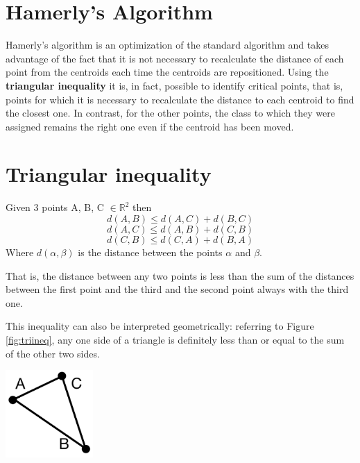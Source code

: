 \documentclass{report}
\begin{document}
\begin{minipage}[b]{0.48\textwidth}
  \section*{Hamerly's Algorithm}
  Hamerly's algorithm is an optimization of the standard algorithm and takes advantage of the fact that it is not necessary to recalculate the distance of each point from the centroids each time the centroids are repositioned. Using the \textbf{triangular inequality} it is, in fact, possible to identify critical points, that is, points for which it is necessary to recalculate the distance to each centroid to find the closest one. In contrast, for the other points, the class to which they were assigned remains the right one even if the centroid has been moved.

  \section*{Triangular inequality}
  Given 3 points A, B, C $\in \mathbb{R}^2$ then  
  \begin{equation}
      d(A, B) \leq d(A, C) + d(B, C)
  \end{equation}
  \begin{equation}
      d(A, C) \leq d(A, B) + d(C, B)
  \end{equation}
  \begin{equation}
      d(C, B) \leq d(C, A) + d(B, A)
  \end{equation}
  Where $d(\alpha, \beta)$ is the distance between the points $\alpha$ and $\beta$.

  That is, the distance between any two points is less than the sum of the distances between the first point and the third and the second point always with the third one.

  This inequality can also be interpreted geometrically: referring to Figure \ref{fig:triineq}, any one side of a triangle is definitely less than or equal to the sum of the other two sides.

  \hspace{0.1in}
  \begin{center}
    \includegraphics[width = 0.25\textwidth]{imgs/triangle.png}
    \label{fig:triineq}
  \end{center}


\end{minipage}
\end{document}
